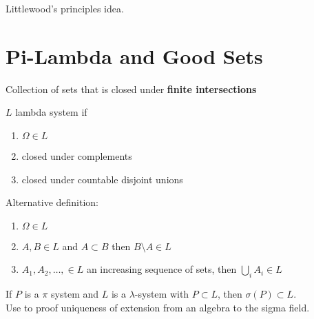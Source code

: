 \documentclass{article}
\begin{document}
Littlewood's principles idea. 

\section{Pi-Lambda and Good Sets}

\begin{definition}[$\pi$-system]
Collection of sets that is closed under \textbf{finite intersections}
\end{definition}
\begin{definition}
$L$ lambda system if
\begin{enumerate}
	\item $\Omega \in L$
	\item closed under complements
	\item closed under countable disjoint unions
\end{enumerate}
Alternative definition:
\begin{enumerate}
	\item $\Omega \in L$
	\item $A,B \in L$ and $A\subset B$ then $B\setminus A \in L$
	\item $A_1, A_2,\ldots, \in L$ an increasing sequence of sets, then $\bigcup_i A_i \in L$
\end{enumerate}
\end{definition}

\begin{theorem}
If $P$ is a $\pi$ system and $L$ is a $\lambda$-system with $P\subset L$, then $\sigma(P)\subset L$.\\
Use to proof uniqueness of extension from an algebra to the sigma field.
\end{theorem}
\begin{example}
\end{example}
\end{document}
